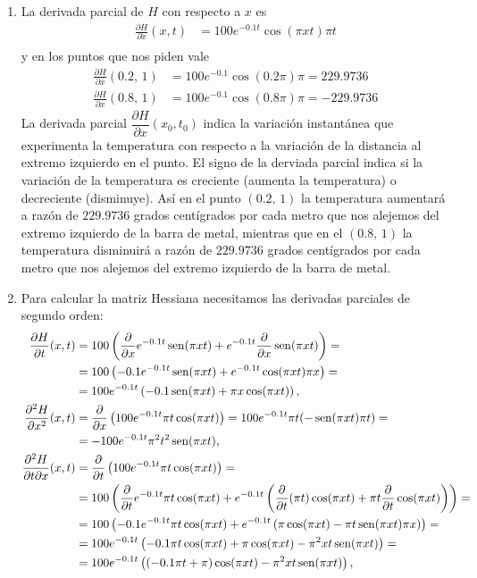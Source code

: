 {\begin{enumerate}
\item La derivada parcial de $H$ con respecto a $x$ es
\begin{align*}
\frac{\partial H}{\partial x}(x,t) &= 100e^{-0.1t}\cos(\pi xt) \pi t \\
\end{align*}
y en los puntos que nos piden vale
\begin{align*}
\frac{\partial H}{\partial x}(0.2,\, 1) &= 100e^{-0.1}\cos(0.2\pi) \pi =
229.9736\\
\frac{\partial H}{\partial x}(0.8,\, 1) &= 100e^{-0.1}\cos(0.8\pi) \pi =
-229.9736
\end{align*}
La derivada parcial $\dfrac{\partial H}{\partial x}(x_0,t_0)$ indica la variación instantánea que experimenta la temperatura con respecto a la variación de la distancia al extremo izquierdo en el punto. El signo de la derviada parcial indica si la variación de la temperatura es creciente (aumenta la temperatura) o decreciente (disminuye). Así en el punto $(0.2,\, 1)$ la temperatura aumentará a razón de $229.9736$ grados centígrados por cada metro que nos alejemos del extremo izquierdo de la barra de metal, mientras que en el $(0.8,\,1)$ la temperatura disminuirá a razón de $229.9736$ grados centígrados por cada metro que nos alejemos del extremo izquierdo de la barra de metal.

\item Para calcular la matriz Hessiana necesitamos las derivadas parciales de
segundo orden:
\begin{align*}
\frac{\partial H}{\partial t} (x,t) &= 100\left(\frac{\partial}{\partial x} e^{-0.1 t} \operatorname{sen} (\pi xt) + e^{-0.1t}\frac{\partial}{\partial x}\operatorname{sen}(\pi xt)\right)=\\
&= 100\left(-0.1e^{-0.1t}\operatorname{sen}(\pi xt) +e^{-0.1t}\cos(\pi xt)\pi x\right) =\\
&= 100 e^{-0.1t}\left(-0.1 \operatorname{sen}(\pi xt) + \pi x \cos(\pi xt)\right),\\
\frac{\partial^2 H}{\partial x^2}(x,t) &= \frac{\partial}{\partial x}\left(100e^{-0.1t}\pi t\cos(\pi xt) \right) = 100e^{-0.1t}\pi t(-\operatorname{sen}(\pi xt) \pi t) =\\
&= -100e^{-0.1t}\pi^2 t^2\operatorname{sen}(\pi xt),\\
\frac{\partial^2 H}{\partial t\partial x}(x,t) &= \frac{\partial}{\partial t}\left(100e^{-0.1t}\pi t\cos(\pi xt) \right) =\\
&= 100\left(\frac{\partial}{\partial t}e^{-0.1t}\pi t\cos(\pi xt) + e^{-0.1t}\left(\frac{\partial}{\partial t}(\pi t)\cos(\pi xt) + \pi t \frac{\partial}{\partial t}\cos(\pi xt)\right) \right) =\\
&= 100\left(-0.1e^{-0.1t}\pi t\cos(\pi xt) + e^{-0.1t}\left(\pi \cos(\pi xt) - \pi t \operatorname{sen}(\pi xt)\pi x\right) \right) =\\
&= 100e^{-0.1t}\left(-0.1\pi t\cos(\pi xt)+\pi \cos(\pi xt) - \pi^2 xt \operatorname{sen}(\pi xt)\right) = \\
&= 100e^{-0.1t}\left((-0.1\pi t+\pi)\cos(\pi xt) - \pi^2 xt \operatorname{sen}(\pi xt)\right),\\
\end{align*}


\end{enumerate}}
